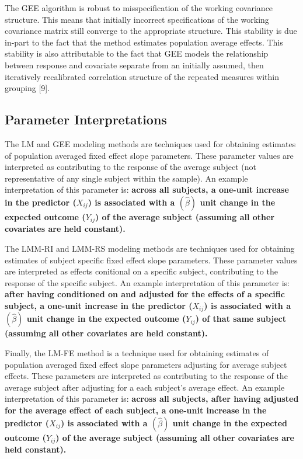 \documentclass[12pt,]{article}
\begin{document}
The GEE algorithm is robust to misspecification of the working
covariance structure. This means that initially incorrect specifications
of the working covariance matrix still converge to the appropriate
structure. This stability is due in-part to the fact that the method
estimates population average effects. This stability is also
attributable to the fact that GEE models the relationship between
response and covariate separate from an initially assumed, then
iteratively recalibrated correlation structure of the repeated measures
within grouping {[}9{]}.

\hypertarget{parameter-interpretations}{%
\subsection{Parameter Interpretations}\label{parameter-interpretations}}

The LM and GEE modeling methods are techniques used for obtaining
estimates of population averaged fixed effect slope parameters. These
parameter values are interpreted as contributing to the response of the
average subject (not representative of any single subject within the
sample). An example interpretation of this parameter is: \textbf{across
all subjects, a one-unit increase in the predictor (\(X_{ij}\)) is
associated with a \((\hat{\beta})\) unit change in the expected outcome
(\(Y_{ij}\)) of the average subject (assuming all other covariates are
held constant).}

\vspace{10pt}

The LMM-RI and LMM-RS modeling methods are techniques used for obtaining
estimates of subject specific fixed effect slope parameters. These
parameter values are interpreted as effects conitional on a specific
subject, contributing to the response of the specific subject. An
example interpretation of this parameter is: \textbf{after having
conditioned on and adjusted for the effects of a specific subject, a
one-unit increase in the predictor (\(X_{ij}\)) is associated with a
\((\hat{\beta})\) unit change in the expected outcome (\(Y_{ij}\)) of
that same subject (assuming all other covariates are held constant).}

\vspace{10pt}

Finally, the LM-FE method is a technique used for obtaining estimates of
population averaged fixed effect slope parameters adjusting for average
subject effects. These parameters are interpreted as contributing to the
response of the average subject after adjusting for a each subject's
average effect. An example interpretation of this parameter is:
\textbf{across all subjects, after having adjusted for the average
effect of each subject, a one-unit increase in the predictor
(\(X_{ij}\)) is associated with a \((\hat{\beta})\) unit change in the
expected outcome (\(Y_{ij}\)) of the average subject (assuming all other
covariates are held constant).}
\end{document}
